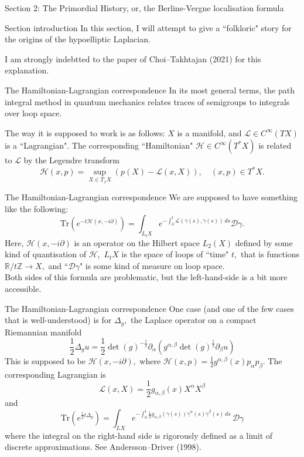 \documentclass{beamer}
\numberwithin{equation}{section}
\theoremstyle{plain}
\theoremstyle{plain}
\theoremstyle{definition}
\theoremstyle{plain}
\theoremstyle{plain}
\theoremstyle{definition}
\newcommand{\Rl}{\mathbb{R}}
\newcommand{\Itgr}{\mathbb{Z}}
\newcommand{\Dc}{\mathcal{D}}
\newcommand{\Hc}{\mathcal{H}}
\newcommand{\Lc}{\mathcal{L}}
\newcommand{\Tr}{\mathrm{Tr}}
\begin{document}
\begin{frame}
    \huge{Section 2: The Primordial History, or, the Berline-Vergne localisation formula}
\end{frame}

\begin{frame}{Section introduction}
  In this section, I will attempt to give a ``folkloric" story for the origins of the hypoelliptic Laplacian.
  
  I am strongly indebtted to the paper of Choi--Takhtajan (2021) for this explanation.
\end{frame}

\begin{frame}{The Hamiltonian-Lagrangian correspondence}
  In its most general terms, the path integral method in quantum mechanics relates traces of semigroups
  to integrals over loop space. 
  
  The way it is supposed to work is as follows: $X$ is a manifold, and $\Lc \in C^\infty(TX)$ is a ``Lagrangian". The corresponding
  ``Hamiltonian" $\Hc\in C^\infty(T^*X)$ is related to $\Lc$ by the Legendre transform 
  \[
    \Hc(x,p) = \sup_{X \in T_xX} (p(X)-\Lc(x,X)),\quad (x,p) \in T^*X.
  \]
\end{frame}

\begin{frame}{The Hamiltonian-Lagrangian correspondence}
  We are supposed to have something like the following:
  \begin{equation}
    \Tr(e^{-t\Hc(x,-i\partial)}) = \int_{L_tX} e^{-\int_0^t \Lc(\gamma(s),\dot{\gamma}(s))\,ds} \Dc \gamma.
  \end{equation}
  Here, $\Hc(x,-i\partial)$ is an operator on the Hilbert space $L_2(X)$ defined by some kind of quantisation of $\Hc,$ $L_tX$ is the space of loops of ``time" $t,$ that is functions $\Rl/t\Itgr \to X,$ and ``$\Dc\gamma$" is some kind of measure on loop space.\\
  
  \pause
  Both sides of this formula are problematic, but the left-hand-side is a bit more accessible. 
\end{frame}

\begin{frame}{The Hamiltonian-Lagrangian correspondence}
  One case (and one of the few cases that is well-understood) is for $\Delta_g,$ the Laplace operator on a compact Riemannian manifold
  \[
    \frac12\Delta_gu = \frac12\det(g)^{-\frac12}\partial_{\alpha}(g^{\alpha,\beta}\det(g)^{\frac12}\partial_{\beta}u)
  \]
  This is supposed to be $\Hc(x,-i\partial),$ where $\Hc(x,p) = \frac12 g^{\alpha,\beta}(x)p_{\alpha}p_{\beta}.$ The corresponding Lagrangian is 
  \[
    \Lc(x,X) = \frac12 g_{\alpha,\beta}(x)X^{\alpha}X^{\beta}
  \]
  and 
  \[
    \Tr(e^{\frac12 t\Delta_g}) = \int_{LX} e^{-\int_0^t \frac12 g_{\alpha,\beta}(\gamma(s))\dot{\gamma}^{\alpha}(s)\dot{\gamma}^\beta(s)\,ds}\, \Dc \gamma
  \]
  where the integral on the right-hand side is rigorously defined as a limit of discrete approximations. See Andersson--Driver (1998).
\end{frame}
\end{document}
